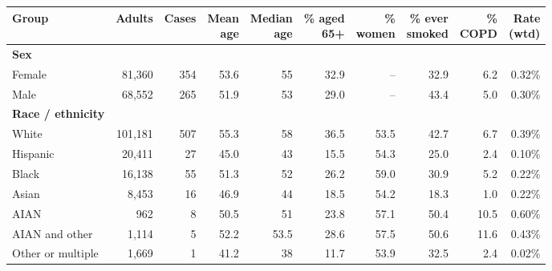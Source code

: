 \begin{tabular*}{\textwidth}{@{\extracolsep{\fill}}lrrrrrrrrr}
\toprule
Group & Adults & Cases & \makecell[b]{Mean\\{}age} & \makecell[b]{Median\\{}age} & \makecell[b]{\% aged\\{}65+} & \makecell[b]{\%\\{}women} & \makecell[b]{\% ever\\{}smoked} & \makecell[b]{\%\\{}COPD} & \makecell[b]{Rate\\{}(wtd)} \\
\midrule
\textbf{Sex} &  &  &  &  &  &  &  &  &  \\
\quad Female & 81,360 & 354 & 53.6 & 55 & 32.9 & -- & 32.9 & 6.2 & 0.32\% \\
\quad Male & 68,552 & 265 & 51.9 & 53 & 29.0 & -- & 43.4 & 5.0 & 0.30\% \\
\midrule
\textbf{Race / ethnicity} &  &  &  &  &  &  &  &  &  \\
\quad White & 101,181 & 507 & 55.3 & 58 & 36.5 & 53.5 & 42.7 & 6.7 & 0.39\% \\
\quad Hispanic & 20,411 & 27 & 45.0 & 43 & 15.5 & 54.3 & 25.0 & 2.4 & 0.10\% \\
\quad Black & 16,138 & 55 & 51.3 & 52 & 26.2 & 59.0 & 30.9 & 5.2 & 0.22\% \\
\quad Asian & 8,453 & 16 & 46.9 & 44 & 18.5 & 54.2 & 18.3 & 1.0 & 0.22\% \\
\quad AIAN & 962 & 8 & 50.5 & 51 & 23.8 & 57.1 & 50.4 & 10.5 & 0.60\% \\
\quad AIAN and other & 1,114 & 5 & 52.2 & 53.5 & 28.6 & 57.5 & 50.6 & 11.6 & 0.43\% \\
\quad Other or multiple & 1,669 & 1 & 41.2 & 38 & 11.7 & 53.9 & 32.5 & 2.4 & 0.02\% \\
\bottomrule
\end{tabular*}
